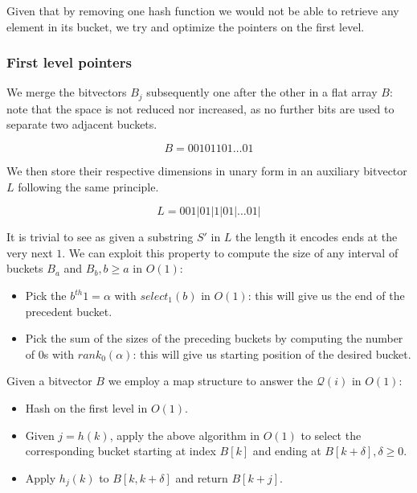 Given that by removing one hash function we would not be able to retrieve any element in its bucket, we try and optimize the pointers on the first level.

\subsubsection{First level pointers}
We merge the bitvectors $B_j$ subsequently one after the other in a flat array $B$: note that the space is not reduced nor increased, as no further bits are used to separate two adjacent buckets.

\begin{equation*}
B = 0 0 1 0 1 1 0 1 \dots 0 1
\end{equation*}

We then store their respective dimensions in unary form in an auxiliary bitvector $L$ following the same principle.

\begin{equation*}
L = 0 0 1 | 0 1 | 1 | 0 1 | \dots 0 1 |
\end{equation*}


It is trivial to see as given a substring $S'$ in $L$ the length it encodes ends at the very next $1$.
We can exploit this property to compute the size of any interval of buckets $B_a$ and $B_b, b \geq a$ in $O(1)$:
\begin{itemize}
\item Pick the $b^{th} 1 = \alpha $ with $select_1(b)$ in $O(1)$: this will give us the end of the precedent bucket.
\item Pick the sum of the sizes of the preceding buckets by computing the number of $0$s with $rank_0(\alpha)$: this will give us starting position of the desired bucket.
\end{itemize}

Given a bitvector $B$ we employ a map structure to answer the $\mathcal{Q}(i)$ in $O(1)$:
\begin{itemize}
\item Hash on the first level in $O(1)$.
\item Given $j = h(k)$, apply the above algorithm in $O(1)$ to select the corresponding bucket starting at index $B[k]$ and ending at $B[k + \delta], \delta \geq 0$.
\item Apply $h_j(k)$ to $B[k, k + \delta]$ and return $B[k + j]$.
\end{itemize}


